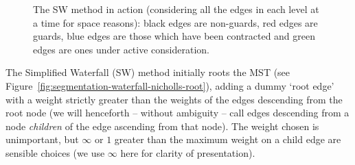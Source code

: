 \documentclass[preprint,a4paper]{elsarticle}
\newenvironment{stusubfig}[1]
{
	\begin{figure}[#1]
	\begin{center}
}
{
	\end{center}
	\end{figure}
}
\begin{document}
\begin{stusubfig}{p}
	\hspace{4mm}%
	\hspace{4mm}%
\caption[The SW method in action]{The SW method in action (considering all the edges in each level at a time for space reasons): black edges are non-guards, red edges are guards, blue edges are those which have been contracted and green edges are ones under active consideration.}
\label{fig:segmentation-waterfall-nicholls-example}
\end{stusubfig}

The Simplified Waterfall (SW) method initially roots the MST (see Figure~\ref{fig:segmentation-waterfall-nicholls-root}), adding a dummy `root edge' with a weight strictly greater than the weights of the edges descending from the root node (we will henceforth -- without ambiguity -- call edges descending from a node \emph{children} of the edge ascending from that node). The weight chosen is unimportant, but $\infty$ or $1$ greater than the maximum weight on a child edge are sensible choices (we use $\infty$ here for clarity of presentation).
\end{document}
